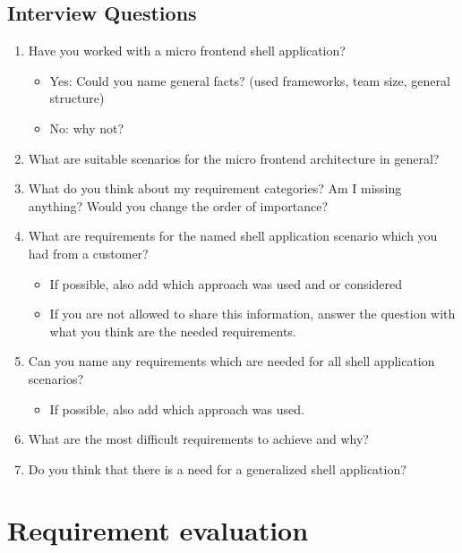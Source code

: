 \section{Interview Questions}\label{cha:appendix_expertinterview_questions}

\begin{enumerate}
    \item Have you worked with a micro frontend shell application?
          \begin{itemize}
              \item Yes: Could you name general facts? (used frameworks, team size, general structure)
              \item No: why not?
          \end{itemize}
    \item What are suitable scenarios for the micro frontend architecture in general?
    \item What do you think about my requirement categories? Am I missing anything? Would you change the order of importance?
    \item What are requirements for the named shell application scenario which you had from a customer?
          \begin{itemize}
              \item If possible, also add which approach was used and or considered
              \item If you are not allowed to share this information, answer the question with what you think are the needed requirements.
          \end{itemize}
    \item Can you name any requirements which are needed for all shell application scenarios?
          \begin{itemize}
              \item If possible, also add which approach was used.
          \end{itemize}
    \item What are the most difficult requirements to achieve and why?
    \item Do you think that there is a need for a generalized shell application?
\end{enumerate}

\chapter{Requirement evaluation}\label{cha:appendix_requirements_overview}

